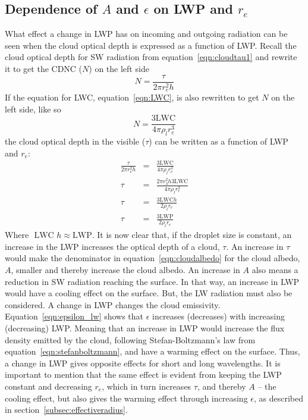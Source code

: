 \subsection{Dependence of $A$ and $\epsilon$ on LWP and $r_e$}
\label{subsec:dependalbeps}
What effect a change in LWP has on incoming and outgoing radiation can be seen when the cloud optical depth is expressed as a function of LWP. Recall the cloud optical depth for SW radiation from equation~\ref{eqn:cloudtau1} and rewrite it to get the CDNC ($N$) on the left side
\begin{equation}
N = \frac{\tau}{2\pi r^2_e h}
\end{equation}
If the equation for LWC, equation~\ref{eqn:LWC}, is also rewritten to get $N$ on the left side, like so
\begin{equation}
N = \frac{3\text{LWC}}{4\pi \rho_l r^3_e}
\end{equation}
the cloud optical depth in the visible ($\tau$) can be written as a function of LWP and $r_e$:
\begin{eqnarray}
\frac{\tau}{2\pi r^2_e h} &=& \frac{3\text{LWC}}{4\pi \rho_l r^3_e}\\
\tau &=& \frac{2\pi r^2_3 h 3\text{LWC}}{4\pi \rho_l r^3_e}\\
\tau &=& \frac{3\text{LWC} h}{2\rho_l r_e}\\
\tau &=& \frac{3\text{LWP}}{2\rho_l r_e}
\label{eqn:cloudtau}
\end{eqnarray}
Where $\text{ LWC }h \approx \text{LWP}$. It is now clear that, if the droplet size is constant, an increase in the LWP increases the optical depth of a cloud, $\tau$. An increase in $\tau$ would make the denominator in equation~\ref{eqn:cloudalbedo} for the cloud albedo, $A$, smaller and thereby increase the cloud albedo. An increase in $A$ also means a reduction in SW radiation reaching the surface. In that way, an increase in LWP would have a cooling effect on the surface. 
But, the LW radiation must also be considered. A change in LWP changes the cloud emissivity. Equation~\ref{eqn:epsilon_lw} shows that $\epsilon$ increases (decreases) with increasing (decreasing) LWP. Meaning that an increase in LWP would increase the flux density emitted by the cloud, following Stefan-Boltzmann's law from equation~\ref{eqn:stefanboltzmann}, and have a warming effect on the surface. Thus, a change in LWP gives opposite effects for short and long wavelengths. It is important to mention that the same effect is evident from keeping the LWP constant and decreasing $r_e$, which in turn increases $\tau$, and thereby $A$ -- the cooling effect, but also gives the warming effect through increasing $\epsilon$, as described in section~\ref{subsec:effectiveradius}.


